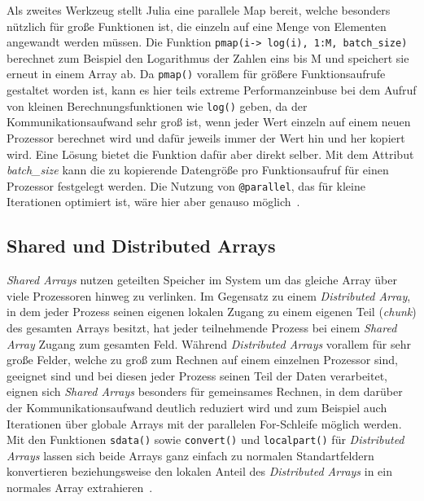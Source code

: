 \documentclass[proseminar,german,utf8]{zihpub}
\begin{document}
Als zweites Werkzeug stellt Julia eine parallele Map bereit, welche besonders nützlich für große Funktionen ist, die einzeln auf eine Menge von Elementen angewandt werden müssen. Die Funktion \verb|pmap(i-> log(i), 1:M, batch_size)| berechnet zum Beispiel den Logarithmus der Zahlen eins bis M und speichert sie erneut in einem Array ab. Da \verb|pmap()| vorallem für größere Funktionsaufrufe gestaltet worden ist, kann es hier teils extreme Performanzeinbuse bei dem Aufruf von kleinen Berechnungsfunktionen wie \verb|log()| geben, da der Kommunikationsaufwand sehr groß ist, wenn jeder Wert einzeln auf einem neuen Prozessor berechnet wird und dafür jeweils immer der Wert hin und her kopiert wird. Eine Lösung bietet die Funktion dafür aber direkt selber. Mit dem Attribut \textit{batch\_size} kann die zu kopierende Datengröße pro Funktionsaufruf für einen Prozessor festgelegt werden. Die Nutzung von \verb|@parallel|, das für kleine Iterationen optimiert ist, wäre hier aber genauso möglich~\cite{JuliaLangDocumentation}.

\subsection{Shared und Distributed Arrays}

\textit{Shared Arrays} nutzen geteilten Speicher im System um das gleiche Array über viele Prozessoren hinweg zu verlinken. Im Gegensatz zu einem \textit{Distributed Array}, in dem jeder Prozess seinen eigenen lokalen Zugang zu einem eigenen Teil (\textit{chunk}) des gesamten Arrays besitzt, hat jeder teilnehmende Prozess bei einem \textit{Shared Array} Zugang zum gesamten Feld. Während \textit{Distributed Arrays} vorallem für sehr große Felder, welche zu groß zum Rechnen auf einem einzelnen Prozessor sind, geeignet sind und bei diesen jeder Prozess seinen Teil der Daten verarbeitet, eignen sich \textit{Shared Arrays} besonders für gemeinsames Rechnen, in dem darüber der Kommunikationsaufwand deutlich reduziert wird und zum Beispiel auch Iterationen über globale Arrays mit der parallelen For-Schleife möglich werden. Mit den Funktionen \verb|sdata()| sowie \verb|convert()| und \verb|localpart()| für \textit{Distributed Arrays} lassen sich beide Arrays ganz einfach zu normalen Standartfeldern konvertieren beziehungsweise den lokalen Anteil des\textit{ Distributed Arrays} in ein normales Array extrahieren~\cite{JuliaLangDocumentation}.
\end{document}
